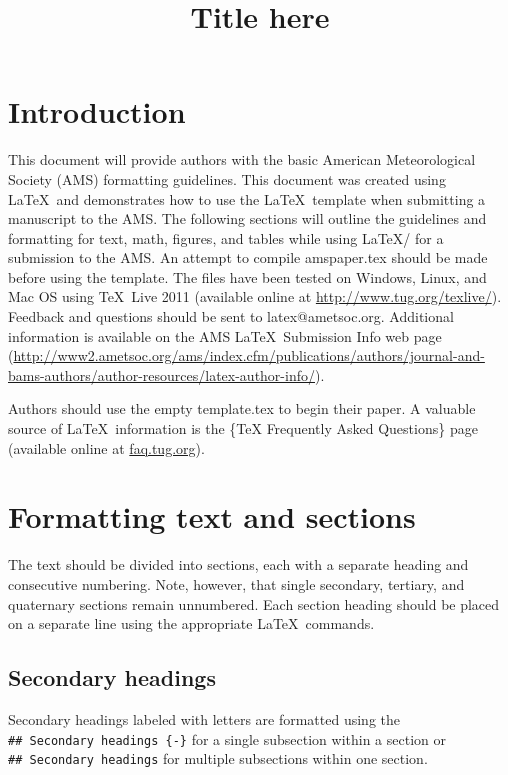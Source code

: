 \documentclass[draft]{ametsoc}
\title{Title here}
\affiliation{American Meteorological Society,Boston, Massachusetts}
\begin{document}
\maketitle
\hypertarget{introduction}{%
\section{Introduction}\label{introduction}}

This document will provide authors with the basic American
Meteorological Society (AMS) formatting guidelines. This document was
created using \LaTeX~and demonstrates how to use the \LaTeX~template
when submitting a manuscript to the AMS. The following sections will
outline the guidelines and formatting for text, math, figures, and
tables while using \LaTeX/ for a submission to the AMS. An attempt to
compile amspaper.tex should be made before using the template. The files
have been tested on Windows, Linux, and Mac OS using \TeX~Live 2011
(available online at \url{http://www.tug.org/texlive/}). Feedback and
questions should be sent to latex@ametsoc.org. Additional information is
available on the AMS \LaTeX~Submission Info web page
(\url{http://www2.ametsoc.org/ams/index.cfm/publications/authors/journal-and-bams-authors/author-resources/latex-author-info/}).

Authors should use the empty template.tex to begin their paper. A
valuable source of \LaTeX~information is the \{TeX Frequently Asked
Questions\} page (available online at \url{faq.tug.org}).

\hypertarget{formatting-text-and-sections}{%
\section{Formatting text and
sections}\label{formatting-text-and-sections}}

The text should be divided into sections, each with a separate heading
and consecutive numbering. Note, however, that single secondary,
tertiary, and quaternary sections remain unnumbered. Each section
heading should be placed on a separate line using the appropriate
\LaTeX~commands.

\hypertarget{secondary-headings}{%
\subsection*{Secondary headings}\label{secondary-headings}}

Secondary headings labeled with letters are formatted using the
\texttt{\#\#\ Secondary\ headings\ \{-\}} for a single subsection within
a section or \texttt{\#\#\ Secondary\ headings} for multiple subsections
within one section.
\end{document}
